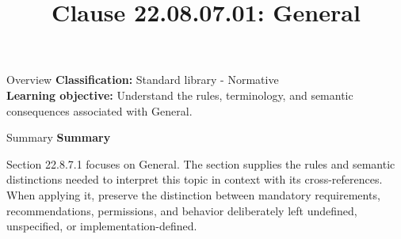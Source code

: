 \documentclass[10pt,letterpaper]{article}
\title{Clause 22.08.07.01: General}
\author{}
\date{}
\begin{document}
\maketitle
\begin{CornellOverviewBox}{Overview}
\textbf{Classification:} Standard library - Normative\\[2pt]
\textbf{Learning objective:} Understand the rules, terminology, and semantic consequences associated with General.
\end{CornellOverviewBox}\begin{CornellSummaryBox}{Summary}
{\sffamily\bfseries\color{Accent} Summary}\par\vspace{3pt}Section 22.8.7.1 focuses on General. The section supplies the rules and semantic distinctions needed to interpret this topic in context with its cross-references. When applying it, preserve the distinction between mandatory requirements, recommendations, permissions, and behavior deliberately left undefined, unspecified, or implementation-defined.
\end{CornellSummaryBox}
\end{document}
